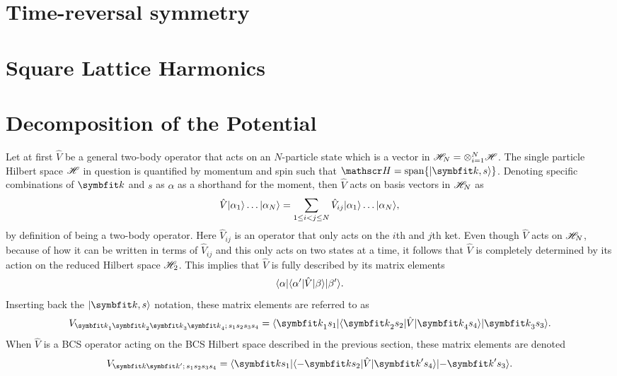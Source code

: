 \section{Time-reversal symmetry}

\section{Square Lattice Harmonics}


\section{Decomposition of the Potential}

Let at first $\hat{V}$ be a general two-body operator that acts on an $N$-particle state which is a vector in $\mathscr{H}_N = \otimes_{i=1}^N\mathscr{H}$. The
single particle Hilbert space $\mathscr{H}$ in question is quantified by momentum and spin such that $\hil=\Span\{\ket{\v{k},s}\}$. Denoting specific combinations
of $\v{k}$ and $s$ as $\alpha$ as a shorthand for the moment, then $\hat{V}$ acts on basis vectors in $\mathscr{H}_N$ as
\begin{equation}
    \label{eq:Group:Potential:twoBodyInteraction}
    \hat{V}\lvert \alpha_1 \rangle\ldots\lvert \alpha_N \rangle = \sum_{1\leq i<j\leq N}\hat{V}_{ij}\lvert \alpha_1 \rangle\ldots\lvert \alpha_N \rangle,
\end{equation}
by definition of being a two-body operator. Here $\hat{V}_{ij}$ is an operator that only acts on the $i$th and $j$th ket. Even though $\hat{V}$ acts on
$\mathscr{H}_N$, because of how it can be written in terms of $\hat{V}_{ij}$ and this only acts on two states at a time, it follows that $\hat{V}$ is
completely determined by its action on the reduced Hilbert space $\mathscr{H}_2$. This implies that $\hat{V}$ is fully described by its matrix elements
\begin{equation}
    \label{eq:Group:Potential:genTwoBodyMatrixElem}
    \langle \alpha \rvert\langle \alpha' \rvert\hat{V}\lvert \beta \rangle\lvert \beta' \rangle.
\end{equation}
Inserting back the $\ket{\v{k},s}$ notation, these matrix elements are referred to as
\begin{equation}
    \label{eq:Group:Potential:momSpinPotentialMatrixElems}
    V_{\v{k}_1\v{k}_2\v{k}_3\v{k}_4;\,s_1s_2s_3s_4} = \bra{\v{k}_1s_1}\bra{\v{k}_2s_2}\hat{V}\ket{\v{k}_4s_4}\ket{\v{k}_3s_3}.
\end{equation}
When $\hat{V}$ is a BCS operator acting on the BCS Hilbert space described in the previous section, these matrix elements are denoted
\begin{equation}
    \label{eq:Group:Potential:bcsTwoBodyMatrixElem}
    V_{\v{k}\v{k}';\,s_1s_2s_3s_4} = \bra{\v{k}s_1}\bra{-\v{k}s_2}\hat{V}\ket{\v{k}'s_4}\ket{-\v{k}'s_3}.
\end{equation}

